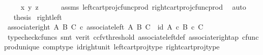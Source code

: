\begin{isabellebody}
\ \isamarkupfalse%
\ {\isachardoublequoteopen}{\isachardot}{\kern0pt}{\isachardot}{\kern0pt}{\isachardot}{\kern0pt}\ {\isacharequal}{\kern0pt}\ {\isasymlangle}{\isasymlangle}x{\isacharcomma}{\kern0pt}\ y{\isasymrangle}{\isacharcomma}{\kern0pt}\ z{\isasymrangle}{\isachardoublequoteclose}\isanewline
\ \ \ \ \isamarkupfalse%
\ assms\ left{\isacharunderscore}{\kern0pt}cart{\isacharunderscore}{\kern0pt}proj{\isacharunderscore}{\kern0pt}cfunc{\isacharunderscore}{\kern0pt}prod\ right{\isacharunderscore}{\kern0pt}cart{\isacharunderscore}{\kern0pt}proj{\isacharunderscore}{\kern0pt}cfunc{\isacharunderscore}{\kern0pt}prod\ \isamarkupfalse%
\ auto\isanewline
\ \ \isamarkupfalse%
\ \isamarkupfalse%
\ {\isacharquery}{\kern0pt}thesis\isacommand{{\isachardot}{\kern0pt}}\isamarkupfalse%
\isanewline
{}\isamarkupfalse%
%
\endisatagproof
{\isafoldproof}%
%
\isadelimproof
\isanewline
%
\endisadelimproof
\isanewline
{}\isamarkupfalse%
\ right{\isacharunderscore}{\kern0pt}left{\isacharcolon}{\kern0pt}\ \isanewline
\ {\isachardoublequoteopen}associate{\isacharunderscore}{\kern0pt}right\ A\ B\ C\ {\isasymcirc}\isactrlsub c\ associate{\isacharunderscore}{\kern0pt}left\ A\ B\ C\ {\isacharequal}{\kern0pt}\ id\ {\isacharparenleft}{\kern0pt}A\ {\isasymtimes}\isactrlsub c\ {\isacharparenleft}{\kern0pt}B\ {\isasymtimes}\isactrlsub c\ C{\isacharparenright}{\kern0pt}{\isacharparenright}{\kern0pt}{\isachardoublequoteclose}\isanewline
%
\isadelimproof
\ \ %
\endisadelimproof
%
\isatagproof
{}\isamarkupfalse%
\ {\isacharparenleft}{\kern0pt}typecheck{\isacharunderscore}{\kern0pt}cfuncs{\isacharcomma}{\kern0pt}\ smt\ {\isacharparenleft}{\kern0pt}verit{\isacharcomma}{\kern0pt}\ ccfv{\isacharunderscore}{\kern0pt}threshold{\isacharparenright}{\kern0pt}\ associate{\isacharunderscore}{\kern0pt}left{\isacharunderscore}{\kern0pt}def\ associate{\isacharunderscore}{\kern0pt}right{\isacharunderscore}{\kern0pt}ap\ cfunc{\isacharunderscore}{\kern0pt}prod{\isacharunderscore}{\kern0pt}unique\ comp{\isacharunderscore}{\kern0pt}type\ id{\isacharunderscore}{\kern0pt}right{\isacharunderscore}{\kern0pt}unit{}\ left{\isacharunderscore}{\kern0pt}cart{\isacharunderscore}{\kern0pt}proj{\isacharunderscore}{\kern0pt}type\ right{\isacharunderscore}{\kern0pt}cart{\isacharunderscore}{\kern0pt}proj{\isacharunderscore}{\kern0pt}type{\isacharparenright}{\kern0pt}%
\endisatagproof
{\isafoldproof}%
%
\isadelimproof
\isanewline
%
\endisadelimproof
\isanewline
{}\isamarkupfalse%

\end{isabellebody}
